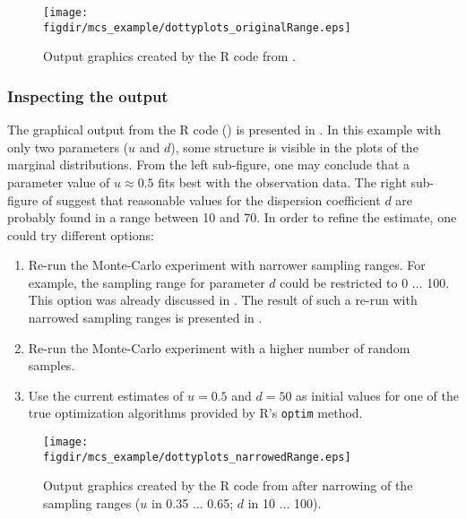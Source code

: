 \begin{figure}
  \centering
  \texttt{[image: \\figdir/mcs\_example/dottyplots\_originalRange.eps]}
  \caption{Output graphics created by the R code from . \label{fig:mops:example_mcs:dottyplots_originalRange}}
\end{figure}

\subsubsection*{Inspecting the output}

The graphical output from the R code () is presented in . In this example with only two parameters ($u$ and $d$), some structure is visible in the plots of the marginal distributions. From the left sub-figure, one may conclude that a parameter value of $u \approx 0.5$ fits best with the observation data. The right sub-figure of  suggest that reasonable values for the dispersion coefficient $d$ are probably found in a range between 10 and 70. In order to refine the estimate, one could try different options:
\begin{enumerate}
  \item Re-run the Monte-Carlo experiment with narrower sampling ranges. For example, the sampling range for parameter $d$ could be restricted to 0 $\ldots$ 100. This option was already discussed in . The result of such a re-run with narrowed sampling ranges is presented in .
  \item Re-run the Monte-Carlo experiment with a higher number of random samples. 
  \item Use the current estimates of $u=0.5$ and $d=50$ as initial values for one of the true optimization algorithms provided by R's \texttt{optim} method.
\end{enumerate}

\begin{figure}
  \centering
  \texttt{[image: \\figdir/mcs\_example/dottyplots\_narrowedRange.eps]}
  \caption{Output graphics created by the R code from  after narrowing of the sampling ranges ($u$ in 0.35 $\ldots$ 0.65; $d$ in 10 $ \ldots$ 100). \label{fig:mops:example_mcs:dottyplots_narrowedRange}}
\end{figure}

